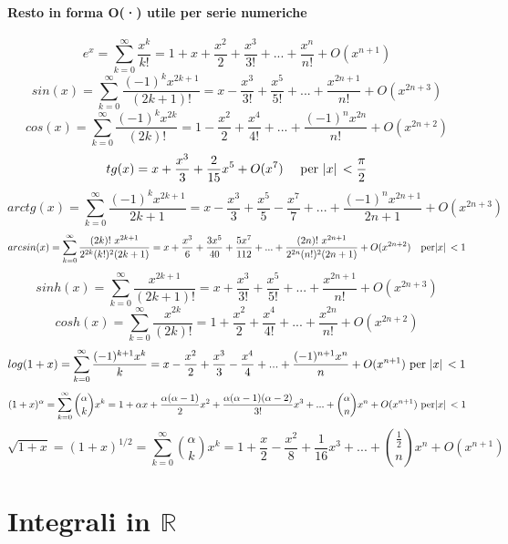 \documentclass[a4paper, titlepage]{report}%
\theoremstyle{definition} %
\theoremstyle{plain}
\theoremstyle{plain}
\theoremstyle{remark}
\theoremstyle{remark}
\theoremstyle{plain}
\theoremstyle{plain}
\theoremstyle{plain}
\theoremstyle{plain}
\theoremstyle{plain}
\begin{document}
\paragraph*{Resto in forma O(·) utile per serie numeriche}
\[
  e^x = \sum_{k = 0}^{\infty}\frac{x^k}{k!} =
        1 + x + \frac{x^2}{2}+ \frac{x^3}{3!} +
        ... + \frac{x^n}{n!}+O(x^{n+1})
\]
\[
   sin(x) = \sum_{k = 0}^{\infty} \frac{(-1)^kx^{2k+1}}{(2k+1)!} =
   x - \frac{x^3}{3!}+ \frac{x^5}{5!} +
   ... + \frac{x^{2n+1}}{n!}+O(x^{2n+3})
\]
\[
    cos(x)=\sum_{k = 0}^{\infty}\frac{(-1)^kx^{2k}}{(2k)!} =
    1 - \frac{x^2}{2}+ \frac{x^4}{4!} +
    ... + \frac{(-1)^{n}x^{2n}}{n!}+O(x^{2n+2})
\]
\[
   tg(x)= x + \frac{x^3}{3} + \frac{2}{15}x^5+O(x^7) 
   \text{   \quad per   }\abs*{x}< \frac{\pi}{2}
\]
\[
   arctg(x)= \sum_{k = 0}^{\infty} \frac{(-1)^kx^{2k+1}}{2k+1}
    = x - \frac{x^3}{3} + \frac{x^5}{5}-\frac{x^7}{7} + ... +
    \frac{(-1)^nx^{2n+1}}{2n+1} + O(x^{2n+3})
\]
\[
   arcsin(x)= \sum_{k = 0}^{\infty} \frac{(2k)! \ x^{2k+1}}{2^{2k}(k!)^2
    (2k+1)} = x + \frac{x^3}{6} + \frac{3x^5}{40}+\frac{5x^7}{112} + ... +
    \frac{(2n)! \ x^{2n+1}}{2^{2n}(n!)^2(2n+1)} + O(x^{2n+2})
    \ \ \text{  per}\abs*{x}<1 
\]
\[
    sinh(x)=\sum_{k = 0}^{\infty}\frac{x^{2k+1}}{(2k+1)!} =
    x + \frac{x^3}{3!} + \frac{x^5}{5!} +
    ... + \frac{x^{2n+1}}{n!}+O(x^{2n+3}) 
\]
\[
   cosh(x)=\sum_{k = 0}^{\infty}\frac{x^{2k}}{(2k)!} =
    1 + \frac{x^2}{2}+ \frac{x^4}{4!} +
    ... + \frac{x^{2n}}{n!}+O(x^{2n+2})
\]   
\[
   log(1+x) =  \sum_{k = 0}^{\infty}\frac{(-1)^{k+1}x^{k}}{k} =
   x - \frac{x^2}{2} + \frac{x^3}{3} - \frac{x^4}{4} +
   ... + \frac{(-1)^{n+1}x^{n}}{n}+O(x^{n+1})  \text{  per}\ \abs*{x}<1 
\]
\[
   (1+x)^{\alpha} =  \sum_{k = 0}^{\infty}\binom{\alpha}{k}  x^k =
   1 + \alpha x + \frac{\alpha(\alpha -1)}{2}x^2 + \frac{\alpha(\alpha -1)
   (\alpha -2)}{3!}x^3 +... + \binom{\alpha}{n}x^n+O(x^{n+1}) 
    \text{  per}\abs*{x}<1 
\]
\[
   \sqrt{1+x}=(1+x)^{1/2} =  \sum_{k = 0}^{\infty}\binom{\alpha}{k}  x^k =
   1 + \frac{x}{2} - \frac{x^2}{8} + \frac{1}{16}x^3 +... + 
   \binom{\frac{1}{2}}{n}x^n+O(x^{n+1}) 
\]

\section*{Integrali in $\mathbb{R}$}
\end{document}
